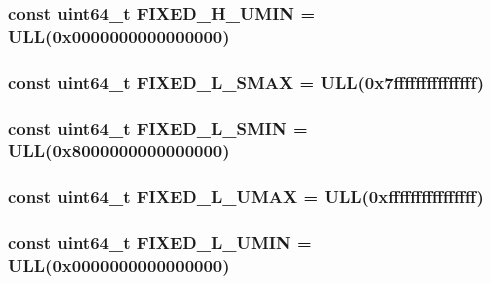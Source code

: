 \label{namespaceMipsISA_a9fe6e8880110446df9f2b48464395dc8}
\hypertarget{namespaceMipsISA_a122eaef6c15e79b76c40d39b5090c7b1}{
\subsubsection[{FIXED\_\-H\_\-UMIN}]{\setlength{\rightskip}{0pt plus 5cm}const uint64\_\-t {\bf FIXED\_\-H\_\-UMIN} = ULL(0x0000000000000000)}}
\label{namespaceMipsISA_a122eaef6c15e79b76c40d39b5090c7b1}
\hypertarget{namespaceMipsISA_a8598ead33f20be1904a1da8108c40afb}{
\subsubsection[{FIXED\_\-L\_\-SMAX}]{\setlength{\rightskip}{0pt plus 5cm}const uint64\_\-t {\bf FIXED\_\-L\_\-SMAX} = ULL(0x7fffffffffffffff)}}
\label{namespaceMipsISA_a8598ead33f20be1904a1da8108c40afb}
\hypertarget{namespaceMipsISA_ad3ea7f4d56d3f8388849a08240cca8ba}{
\subsubsection[{FIXED\_\-L\_\-SMIN}]{\setlength{\rightskip}{0pt plus 5cm}const uint64\_\-t {\bf FIXED\_\-L\_\-SMIN} = ULL(0x8000000000000000)}}
\label{namespaceMipsISA_ad3ea7f4d56d3f8388849a08240cca8ba}
\hypertarget{namespaceMipsISA_a7009b23763ff7f022676866ad80e2abc}{
\subsubsection[{FIXED\_\-L\_\-UMAX}]{\setlength{\rightskip}{0pt plus 5cm}const uint64\_\-t {\bf FIXED\_\-L\_\-UMAX} = ULL(0xffffffffffffffff)}}
\label{namespaceMipsISA_a7009b23763ff7f022676866ad80e2abc}
\hypertarget{namespaceMipsISA_a3f3ee51cb5f4d1e09a5b0657804afaec}{
\subsubsection[{FIXED\_\-L\_\-UMIN}]{\setlength{\rightskip}{0pt plus 5cm}const uint64\_\-t {\bf FIXED\_\-L\_\-UMIN} = ULL(0x0000000000000000)}}
